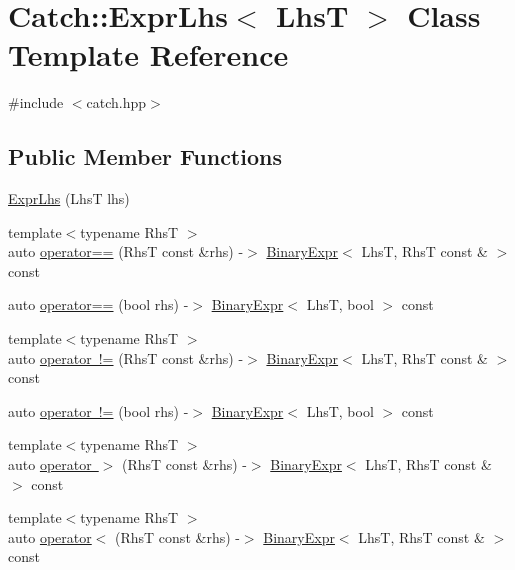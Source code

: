 \hypertarget{class_catch_1_1_expr_lhs}{}\section{Catch\+::Expr\+Lhs$<$ LhsT $>$ Class Template Reference}
\label{class_catch_1_1_expr_lhs}


{\ttfamily \#include $<$catch.\+hpp$>$}

\subsection*{Public Member Functions}
\begin{DoxyCompactItemize}
\item 
\mbox{\hyperlink{class_catch_1_1_expr_lhs_ad22c6af1a7d6993240624d299714a479}{Expr\+Lhs}} (LhsT lhs)
\item 
{\footnotesize template$<$typename RhsT $>$ }\\auto \mbox{\hyperlink{class_catch_1_1_expr_lhs_af218aaf7b5b0a0ebb6b3697f2c89893d}{operator==}} (RhsT const \&rhs) -\/$>$ \mbox{\hyperlink{class_catch_1_1_binary_expr}{Binary\+Expr}}$<$ LhsT, RhsT const \& $>$ const
\item 
auto \mbox{\hyperlink{class_catch_1_1_expr_lhs_ab707a84abdffbdc35962a495e238d393}{operator==}} (bool rhs) -\/$>$ \mbox{\hyperlink{class_catch_1_1_binary_expr}{Binary\+Expr}}$<$ LhsT, bool $>$ const
\item 
{\footnotesize template$<$typename RhsT $>$ }\\auto \mbox{\hyperlink{class_catch_1_1_expr_lhs_af4c6b85fb0d089fcf55d961e1efed5ea}{operator !=}} (RhsT const \&rhs) -\/$>$ \mbox{\hyperlink{class_catch_1_1_binary_expr}{Binary\+Expr}}$<$ LhsT, RhsT const \& $>$ const
\item 
auto \mbox{\hyperlink{class_catch_1_1_expr_lhs_a75c4081701b1e57c32ffbdf124fe4297}{operator !=}} (bool rhs) -\/$>$ \mbox{\hyperlink{class_catch_1_1_binary_expr}{Binary\+Expr}}$<$ LhsT, bool $>$ const
\item 
{\footnotesize template$<$typename RhsT $>$ }\\auto \mbox{\hyperlink{class_catch_1_1_expr_lhs_af4f6dc7eeac031cfdc4fd4b78517e5b8}{operator $>$}} (RhsT const \&rhs) -\/$>$ \mbox{\hyperlink{class_catch_1_1_binary_expr}{Binary\+Expr}}$<$ LhsT, RhsT const \& $>$ const
\item 
{\footnotesize template$<$typename RhsT $>$ }\\auto \mbox{\hyperlink{class_catch_1_1_expr_lhs_afd1ce21cb0be233a63cbdd7724adffea}{operator$<$}} (RhsT const \&rhs) -\/$>$ \mbox{\hyperlink{class_catch_1_1_binary_expr}{Binary\+Expr}}$<$ LhsT, RhsT const \& $>$ const

\end{DoxyCompactItemize}
